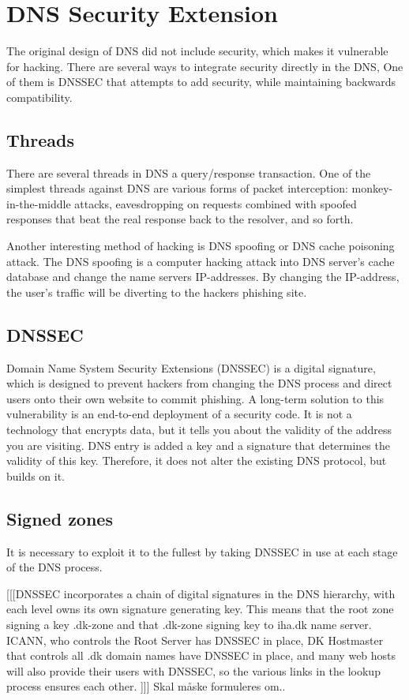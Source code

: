
\section{DNS Security Extension}
\label{DNS Security Extensions}
The original design of DNS did not include security, which makes it vulnerable for hacking.
There are several ways to integrate security directly in the DNS, One of them is DNSSEC that attempts to add security, while maintaining backwards compatibility.

\subsection{Threads}
There are several threads in DNS a query/response transaction.
One of the simplest threads against DNS are various forms of packet interception: monkey-in-the-middle attacks, eavesdropping on requests combined with spoofed responses that beat the real response back to the resolver, and so forth.

Another interesting method of hacking is DNS spoofing or DNS cache poisoning attack.
The DNS spoofing is a computer hacking attack into DNS server's cache database and change the name servers IP-addresses. By changing the IP-address, the user's traffic will be diverting to the hackers phishing site.

\subsection{DNSSEC}
Domain Name System Security Extensions (DNSSEC) is a digital signature, which is designed to prevent hackers from changing the DNS process and direct users onto their own website to commit phishing. A long-term solution to this vulnerability is an end-to-end deployment of a security code. It is not a technology that encrypts data, but it tells you about the validity of the address you are visiting. DNS entry is added a key and a signature that determines the validity of this key. Therefore, it does not alter the existing DNS protocol, but builds on it.

\subsection{Signed zones}
It is necessary to exploit it to the fullest by taking DNSSEC in use at each stage of the DNS process.

[[[DNSSEC incorporates a chain of digital signatures in the DNS hierarchy, with each level owns its own signature generating key. This means that the root zone signing a key .dk-zone and that .dk-zone signing key to iha.dk name server. ICANN, who controls the Root Server has DNSSEC in place, DK Hostmaster that controls all .dk domain names have DNSSEC in place, and many web hosts will also provide their users with DNSSEC, so the various links in the lookup process ensures each other. ]]] Skal måske formuleres om..
